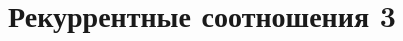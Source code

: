 \documentclass[14pt]{article}
\begin{document}
\title{Рекуррентные соотношения 3}

\maketitle


\end{document}

